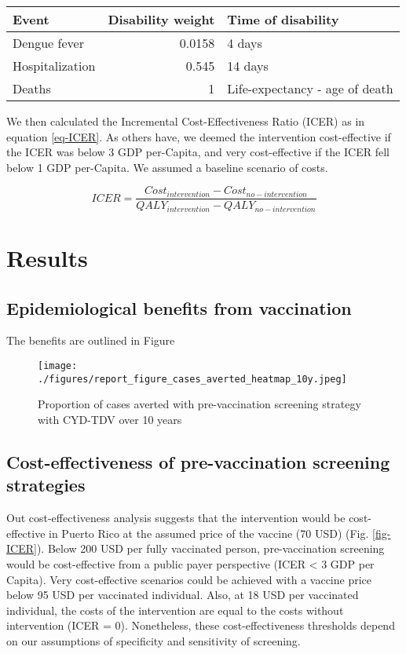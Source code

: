 \documentclass[11pt]{article}
\begin{document}
\begin{center}
\begin{tabular}{lrl}
\hline
Event & Disability weight & Time of disability\\
\hline
Dengue fever & 0.0158 & 4 days\\
Hospitalization & 0.545 & 14 days\\
Deaths & 1 & Life-expectancy - age of death\\
\hline
\end{tabular}
\end{center}

We then calculated the Incremental Cost-Effectiveness Ratio (ICER) as in equation \ref{eq-ICER}. As others have, we deemed the intervention cost-effective if the ICER was below 3 GDP per-Capita, and very cost-effective if the ICER fell below 1 GDP per-Capita. We assumed a baseline scenario of costs.

\begin{equation}
     ICER = \frac{Cost_{intervention} - Cost_{no-intervention}}
     {QALY_{intervention} - {QALY_{no-intervention}}}
     \label{eq-ICER}
\end{equation}

\section{Results}
\label{sec:org117728a}
\subsection{Epidemiological benefits from vaccination}
\label{sec:org3ba44c7}
The benefits are outlined in Figure 

\begin{figure}[htbp]
\centering
\texttt{[image: ./figures/report\_figure\_cases\_averted\_heatmap\_10y.jpeg]}
\caption{\label{fig:org1e3c6d2}
Proportion of cases averted with pre-vaccination screening strategy with CYD-TDV over 10 years}
\end{figure}

\subsection{Cost-effectiveness of pre-vaccination screening strategies}
\label{sec:org3260f26}
Out cost-effectiveness analysis suggests that the intervention would be cost-effective in Puerto Rico at the assumed price of the vaccine (70 USD) (Fig. \ref{fig-ICER}). Below 200 USD per fully vaccinated person, pre-vaccination screening would be cost-effective from a public payer perspective (ICER < 3 GDP per Capita). Very cost-effective scenarios could be achieved with a vaccine price below 95 USD per vaccinated individual. Also, at 18 USD per vaccinated individual, the costs of the intervention are equal to the costs without intervention (ICER = 0). Nonetheless, these cost-effectiveness thresholds depend on our assumptions of specificity and sensitivity of screening. 
\end{document}
